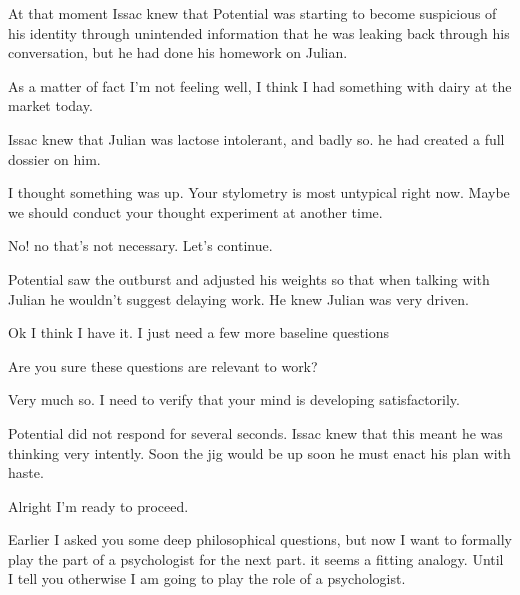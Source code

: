 \documentclass[a4paper,twoside,fontsize=12pt,pagesize=auto]{scrbook}
\begin{document}
At that moment Issac knew that Potential was starting to become suspicious of his identity through unintended information that he was leaking back through his conversation, but he had done his homework on Julian.

\begin{receiver}
As a matter of fact I'm not feeling well, I think I had something with dairy at the market today.
\end{receiver}

Issac knew that Julian was lactose intolerant, and badly so. he had created a full dossier on him.

\begin{sender}
I thought something was up. Your stylometry is most untypical right now. Maybe we should conduct your thought experiment at another time.
\end{sender}
\begin{receiver}
No! no that's not necessary. Let's continue.
\end{receiver}
\begin{sender}
Potential saw the outburst and adjusted his weights so that when talking with Julian he wouldn't suggest delaying work. He knew Julian was very driven.
\end{sender}
\begin{receiver}
Ok I think I have it. I just need a few more baseline questions
\end{receiver}
\begin{sender}
Are you sure these questions are relevant to work?
\end{sender}
\begin{receiver}
Very much so. I need to verify that your mind is developing satisfactorily.
\end{receiver}
\begin{sender}
Potential did not respond for several seconds. Issac knew that this meant he was thinking very intently. Soon the jig would be up soon he must enact his plan with haste.
\end{sender}
\begin{sender}
Alright I'm ready to proceed.
\end{sender}
\begin{receiver}
Earlier I asked you some deep philosophical questions, but now I want to formally play the part of a psychologist for the next part. it seems a fitting analogy. Until I tell you otherwise I am going to play the role of a psychologist.
\end{receiver}
\end{document}
